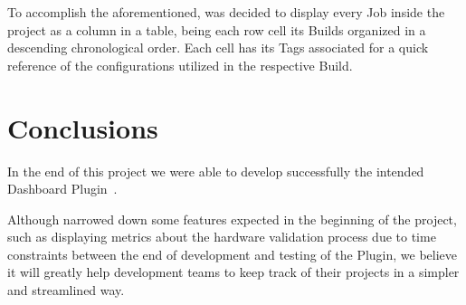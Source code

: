 \documentclass[9pt,a4paper]{extarticle}
\begin{document}
\begin{multicols}{2}
To accomplish the aforementioned, was decided to display every Job inside the project as a column in a table, being each row cell its Builds organized in a descending chronological order. Each cell has its Tags associated for a quick reference of the configurations utilized in the respective Build.

\section{Conclusions}\label{sec:conclui}

In the end of this project we were able to develop successfully the intended Dashboard Plugin~\cite{jksn:myplugin}. 

Although narrowed down some features expected in the beginning of the project, such as displaying metrics about the hardware validation process due to time constraints between the end of development and testing  of the Plugin, we believe it will greatly help development teams to keep track of their projects in a simpler and streamlined way. 



\end{multicols}
\end{document}
